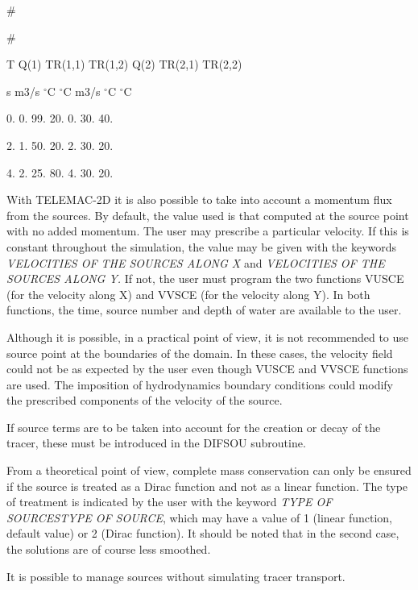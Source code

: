  \#

 \#

 T     Q(1)   TR(1,1)    TR(1,2)   Q(2)   TR(2,1)   TR(2,2)

 s     m3/s    ${}^\circ$C        ${}^\circ$C        m3/s     ${}^\circ$C        ${}^\circ$C

 0.     0.     99.        20.        0.      30.      40.

 2.     1.     50.        20.        2.      30.      20.

 4.     2.     25.        80.        4.      30.      20.

 With TELEMAC-2D it is also possible to take into account a momentum flux from the sources. By default, the value used is that computed at the source point with no added momentum. The user may prescribe a particular velocity. If this is constant throughout the simulation, the value may be given with the keywords \textit{VELOCITIES OF THE SOURCES ALONG X} and \textit{VELOCITIES OF THE SOURCES ALONG Y.} If not, the user must program the two functions VUSCE (for the velocity along X) and VVSCE (for the velocity along Y). In both functions, the time, source number and depth of water are available to the user.

 Although it is possible, in a practical point of view, it is not recommended to use source point at the boundaries of the domain. In these cases, the velocity field could not be as expected by the user even though VUSCE and VVSCE functions are used. The imposition of hydrodynamics boundary conditions could modify the prescribed components of the velocity of the source.

 If source terms are to be taken into account for the creation or decay of the tracer, these must be introduced in the DIFSOU subroutine.

 From a theoretical point of view, complete mass conservation can only be ensured if the source is treated as a Dirac function and not as a linear function. The type of treatment is indicated by the user with the keyword \textit{TYPE OF SOURCESTYPE OF SOURCE}, which may have a value of 1 (linear function, default value) or 2 (Dirac function). It should be noted that in the second case, the solutions are of course less smoothed.

 It is possible to manage sources without simulating tracer transport.


